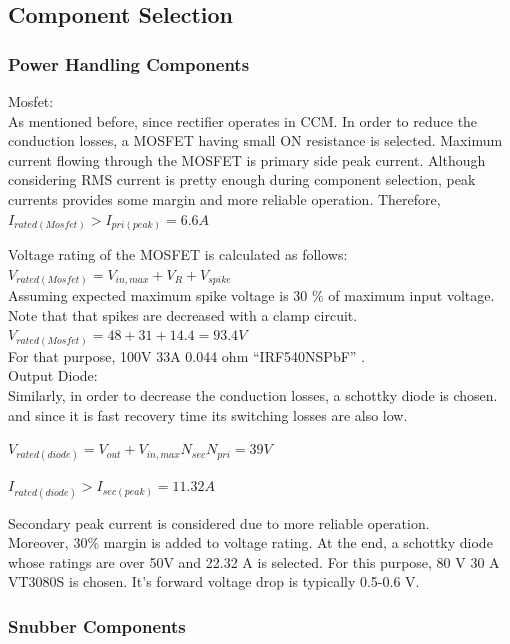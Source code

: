 \documentclass{article}
\begin{document}
\subsection{Component Selection}

\subsubsection{Power Handling Components}

Mosfet:\\
As mentioned before, since rectiﬁer operates in CCM. In order to reduce the conduction losses, a MOSFET having small ON resistance is selected.
Maximum current ﬂowing through the MOSFET is primary side peak current. Although considering RMS current is pretty enough during component selection, peak currents provides some margin and more reliable operation. Therefore,\\
$I_{rated(Mosfet)} > I_{pri(peak)} = 6.6A$

 Voltage rating of the MOSFET is calculated as follows: \\
$V_{rated(Mosfet)} = V_{in,max} + V_R + V_{spike}$\\
Assuming expected maximum spike voltage is 30 \% of maximum input voltage. Note that that spikes are decreased with a clamp circuit.\\
$V_{rated(Mosfet)} =48 + 31 + 14.4 = 93.4V$\\
For that purpose, 100V 33A 0.044 ohm “IRF540NSPbF” .\\
Output Diode:\\
Similarly, in order to decrease the conduction losses, a schottky diode is chosen. and since it is fast recovery time its switching losses are also low.

$V_{rated(diode)} = V_{out}+ V_{in,max}N_{sec} N_{pri}= 39V$

$I_{rated(diode)}> I_{sec(peak)} = 11.32A$

Secondary peak current is considered due to more reliable operation.\\ Moreover, 30\% margin is added to voltage rating. At the end, a schottky diode whose ratings are over 50V and 22.32 A is selected. For this purpose, 80 V 30 A VT3080S is chosen. It’s forward voltage drop is typically 0.5-0.6 V.

\subsubsection{Snubber Components}
\end{document}
